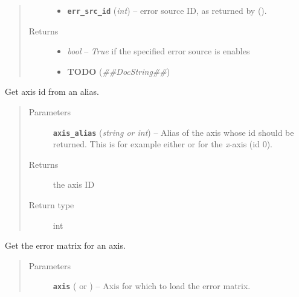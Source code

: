 \documentclass[a4paper,10pt,english]{sphinxmanual}
\begin{document}
\begin{fulllineitems}
\begin{fulllineitems}
\begin{quote}
\begin{description}
\begin{itemize}
\item {} 
\textbf{\texttt{err\_src\_id}} (\emph{int}) -- error source ID, as returned by
{\hyperref[module_doc:kafe.dataset.Dataset.add_error_source]{\emph{}}} ().

\end{itemize}

\item[{Returns}] \leavevmode
\begin{itemize}
\item {} 
\emph{bool} --
\emph{True} if the specified error source is enables

\item {} 
\textbf{TODO} (\emph{\#\#DocString\#\#})

\end{itemize}


\end{description}\end{quote}

\end{fulllineitems}


\begin{fulllineitems}
\label{module_doc:kafe.dataset.Dataset.get_axis}
Get axis id from an alias.
\begin{quote}\begin{description}
\item[{Parameters}] \leavevmode
\textbf{\texttt{axis\_alias}} (\emph{string or int}) -- Alias of the axis whose id should be returned. This is for example
either  or  for the \emph{x}-axis (id 0).

\item[{Returns}] \leavevmode
the axis ID

\item[{Return type}] \leavevmode
int

\end{description}\end{quote}

\end{fulllineitems}


\begin{fulllineitems}
\label{module_doc:kafe.dataset.Dataset.get_cov_mat}
Get the error matrix for an axis.
\begin{quote}\begin{description}
\item[{Parameters}] \leavevmode
\textbf{\texttt{axis}} ( or ) -- Axis for which to load the error matrix.


\end{description}
\end{quote}
\end{fulllineitems}
\end{fulllineitems}
\end{document}

